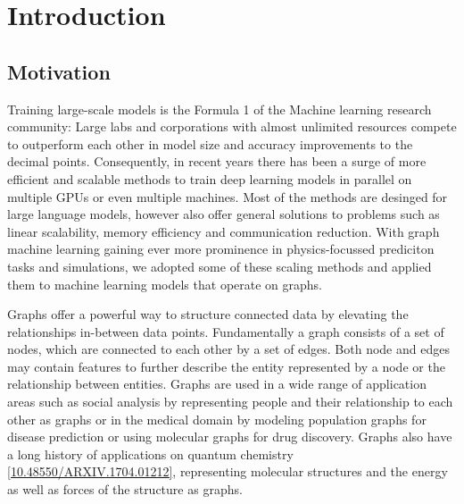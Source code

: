 \section{Introduction}

\subsection{Motivation}

Training large-scale models is the Formula 1 of the Machine learning research community: Large labs and corporations with 
almost unlimited resources compete to outperform each other in model size and accuracy improvements to the decimal points. 
Consequently, in recent years there has been a surge of more efficient and scalable methods to train deep learning models 
in parallel on multiple GPUs or even multiple machines. Most of the methods are desinged for large language models, however 
also offer general solutions to problems such as linear scalability, memory efficiency and 
communication reduction. With graph machine learning gaining ever more prominence in physics-focussed prediciton tasks and 
simulations, we adopted some of these scaling methods and applied them to machine learning models that operate on graphs. 

Graphs offer a powerful way to structure connected data by elevating the relationships in-between data points. 
Fundamentally a graph consists of a set of nodes, which are connected to each other by a set of edges. Both node 
and edges may contain features to further describe the entity represented by a node or the relationship between entities.
Graphs are used in a wide range of application areas such as social analysis by representing people and their relationship 
to each other as graphs or in the medical domain by modeling population graphs for disease prediction or using molecular graphs 
for drug discovery. Graphs also have a long history of applications on quantum chemistry
\ref*{10.48550/ARXIV.1704.01212}, representing molecular 
structures and the energy as well as forces of the structure as graphs. 

